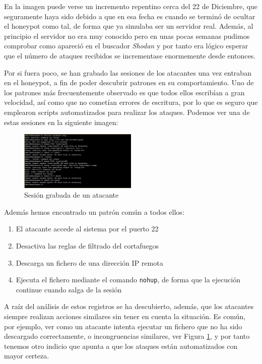\documentclass[journal]{IEEEtran}
\begin{document}
En la imagen puede verse un incremento repentino cerca del 22 de Diciembre, que seguramente haya sido debido a que en esa fecha es cuando se terminó de ocultar el honeypot como tal, de forma que ya simulaba ser un servidor real. Además, al principio el servidor no era muy conocido pero en unas pocas semanas pudimos comprobar como apareció en el buscador \textit{Shodan} \cite{shodan} y por tanto era lógico esperar que el número de ataques recibidos se incrementase enormemente desde entonces.

Por si fuera poco, se han grabado las sesiones de los atacantes una vez entraban en el honeypot, a fin de poder descubrir patrones en su comportamiento. Uno de los patrones más frecuentemente observado es que todos ellos escribían a gran velocidad, así como que no cometían errores de escritura, por lo que es seguro que emplearon scripts automatizados para realizar los ataques. Podemos ver una de estas sesiones en la siguiente imagen:

\begin{figure}[H]
\centering
\includegraphics[width=0.5\textwidth]{img/session}
\caption{Sesión grabada de un atacante}
\label{fig:session}
\end{figure}

Además hemos encontrado un patrón común a todos ellos:
\begin{enumerate}
\item El atacante accede al sistema por el puerto 22
\item Desactiva las reglas de filtrado del cortafuegos
\item Descarga un fichero de una dirección IP remota
\item Ejecuta el fichero mediante el comando {\tt nohup}, de forma que la ejecución continue cuando salga de la sesión
\end{enumerate}

A raíz del análisis de estos registros se ha descubierto, además, que los atacantes siempre realizan acciones similares sin tener en cuenta la situación. Es común, por ejemplo, ver como un atacante intenta ejecutar un fichero que no ha sido descargado correctamente, o incongruencias similares, ver Figura \ref{fig:session}, y por tanto tenemos otro indicio que apunta a que los ataques están automatizados con mayor certeza.
\end{document}
